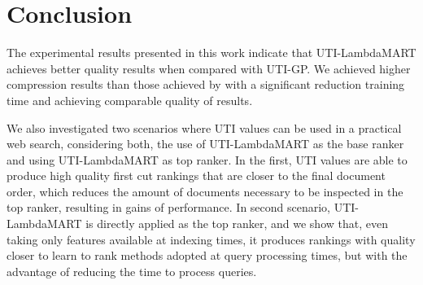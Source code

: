 \documentclass[preprint,review,10pt,3p]{elsarticle}
\begin{document}





\section{Conclusion}
The experimental results presented in this work indicate that UTI-LambdaMART achieves better quality results when compared with UTI-GP. We achieved higher compression results than those achieved by \cite{costa2012lepref} with a significant reduction training time and achieving comparable quality of results. 

We also investigated two scenarios where UTI values  can be used in a practical web search, considering both, the use of UTI-LambdaMART as the base  ranker and using UTI-LambdaMART as top ranker. In the first, UTI values are able to produce high quality first cut rankings that are closer to the final document order, which  reduces the amount of documents necessary to be inspected in the top ranker, resulting in gains of performance. In second scenario, UTI-LambdaMART is directly applied as the top ranker, and we show that, even taking only features available at indexing times, it produces rankings with quality closer  to learn to rank  methods adopted at query processing times, but with the advantage of reducing the time to process queries.

\label{conclusion}



% 
% 
% 
% 
% 
% 
% 
% 
% 
% 
% 
% 


\end{document}
